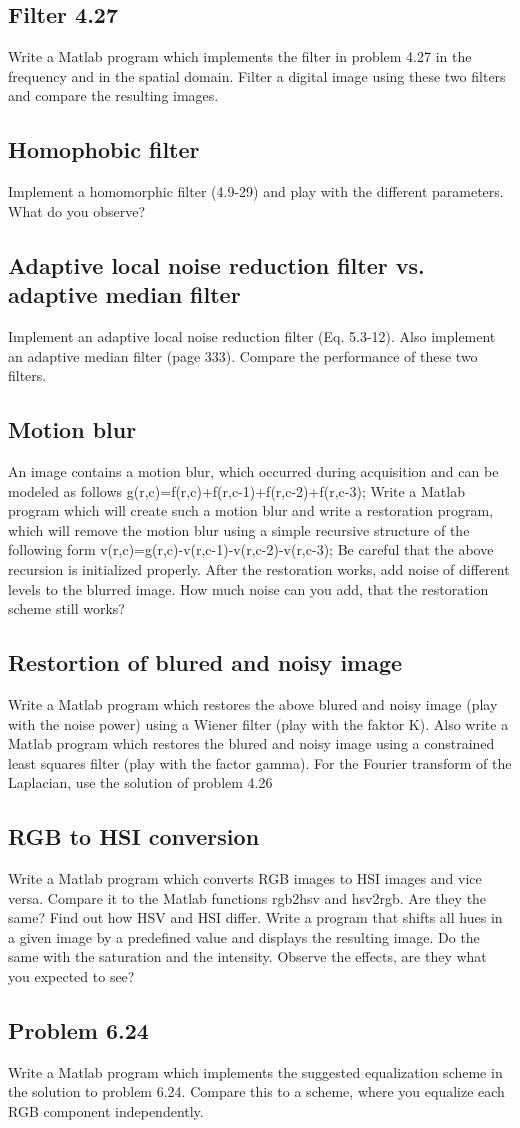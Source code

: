 \subsection{Filter 4.27}
Write a Matlab program which implements the filter in problem 4.27 in the
frequency and in the spatial domain. Filter a digital image using these two filters and compare the resulting images.
\subsection{Homophobic filter}
Implement a homomorphic filter (4.9-29) and play with the different parameters.
What do you observe?
\subsection{Adaptive local noise reduction filter vs. adaptive median filter}
Implement an adaptive local noise reduction filter (Eq. 5.3-12). Also implement
an adaptive median filter (page 333). Compare the performance of these two filters.
\subsection{Motion blur}
An image contains a motion blur, which occurred during acquisition and can be modeled as follows g(r,c)=f(r,c)+f(r,c-1)+f(r,c-2)+f(r,c-3);
Write a Matlab program which will create such a motion blur and write a restoration program, which will remove the motion blur using a simple recursive structure of the following form  v(r,c)=g(r,c)-v(r,c-1)-v(r,c-2)-v(r,c-3);
Be careful that the above recursion is initialized properly. After the restoration works, add noise of different levels to the blurred image. How much noise can you add, that the restoration scheme still works?
\subsection{Restortion of blured and noisy image}
Write a Matlab program which restores the above blured and noisy image (play
with the noise power) using a Wiener filter (play with the faktor K). Also write a Matlab program which restores the blured and noisy image using a constrained least squares filter (play with the factor gamma). For the Fourier transform of the Laplacian, use the solution of problem 4.26
\subsection{RGB to HSI conversion}
Write a Matlab program which converts RGB images to HSI images and vice versa.
Compare it to the Matlab functions rgb2hsv and hsv2rgb. Are they the same?  Find out how HSV and HSI differ. Write a program that shifts all hues in a given image by a predefined value and displays the resulting image. Do the same with the saturation and the intensity. Observe the effects, are they what you expected to see?
\subsection{Problem 6.24}
Write a Matlab program which implements the suggested equalization scheme in the
solution to problem 6.24.  Compare this to a scheme, where you equalize each RGB component independently.
